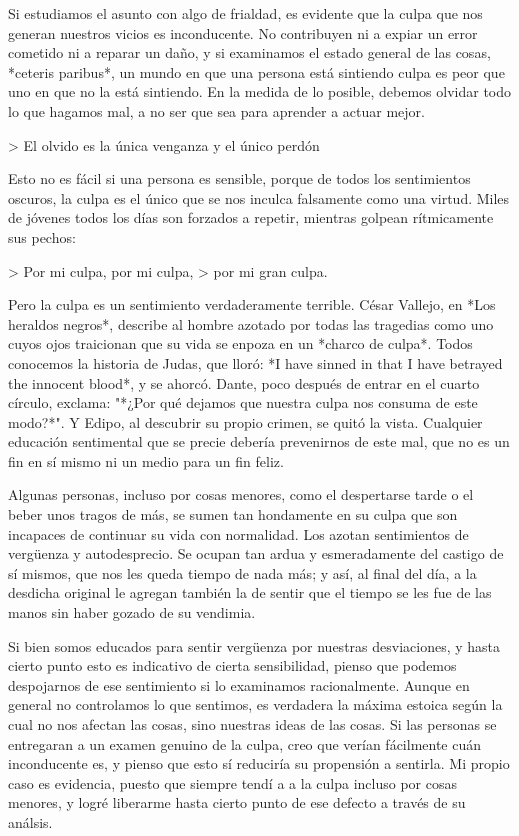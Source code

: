 \documentclass[a4paper, 12pt]{article}
\begin{document}
Si estudiamos el asunto con algo de frialdad, es evidente que la culpa que
nos generan nuestros vicios es inconducente. No contribuyen ni a expiar un
error cometido ni a reparar un daño, y si examinamos el estado general de las
cosas, *ceteris paribus*, un mundo en que una persona está sintiendo
culpa es peor que uno en que no la está sintiendo. En la medida de lo posible,
debemos olvidar todo lo que hagamos mal, a no ser que sea para aprender a
actuar mejor.

> El olvido es la única venganza y el único perdón

Esto no es fácil si una persona es sensible, porque de todos los sentimientos
oscuros, la culpa es el único que se nos inculca falsamente como una virtud.
Miles de jóvenes todos los días son forzados a repetir, mientras golpean
rítmicamente sus pechos:

> Por mi culpa, por mi culpa,
> por mi gran culpa.

Pero la culpa es un sentimiento verdaderamente terrible. César Vallejo, en
*Los heraldos negros*, describe al hombre azotado por todas las
tragedias como uno cuyos ojos traicionan que su vida se enpoza en un
*charco de culpa*. Todos conocemos la historia de Judas, que lloró:
*I have sinned in that I have betrayed the innocent blood*, y se ahorcó.
Dante, poco después de entrar en el cuarto círculo, exclama: "*¿Por qué
dejamos que nuestra culpa nos consuma de este modo?*". Y Edipo, al descubrir su
propio crimen, se quitó la vista. Cualquier educación sentimental que se precie
debería prevenirnos de este mal, que no es un fin en sí mismo ni un medio para un
fin feliz.

Algunas personas, incluso por cosas menores, como el despertarse tarde o el
beber unos tragos de más, se sumen tan hondamente en su culpa que son incapaces
de continuar su vida con normalidad. Los azotan sentimientos de vergüenza y
autodesprecio. Se ocupan tan ardua y esmeradamente del castigo de sí mismos,
que nos les queda tiempo de nada más; y así, al final del día, a la desdicha
original le agregan también la de sentir que el tiempo se les fue de las manos
sin haber gozado de su vendimia.

Si bien somos educados para sentir vergüenza por nuestras desviaciones, y hasta
cierto punto esto es indicativo de cierta sensibilidad, pienso que podemos
despojarnos de ese sentimiento si lo examinamos racionalmente. 
Aunque en general no controlamos lo que sentimos, es verdadera la máxima
estoica según la cual no nos afectan las cosas, sino nuestras ideas de las
cosas. Si las personas se entregaran a un examen genuino de la culpa, creo que
verían fácilmente cuán inconducente es, y pienso que esto sí reduciría su
propensión a sentirla. Mi propio caso es evidencia, puesto que siempre tendí a
a la culpa incluso por cosas menores, y logré liberarme hasta cierto punto de
ese defecto a través de su análsis.
\end{document}
